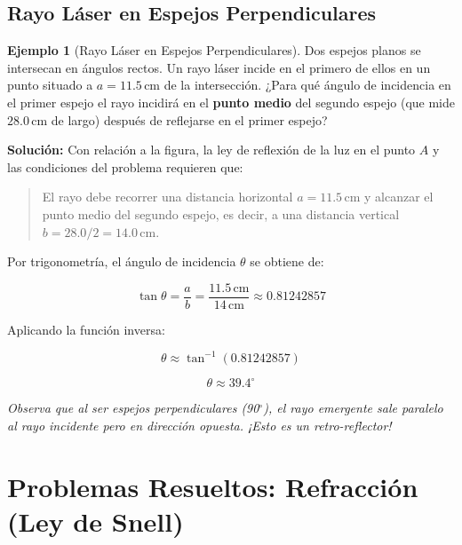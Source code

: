 \documentclass[12pt, a4paper]{article}
\newcommand{\grado}{$^{\circ}$}
\theoremstyle{definition}
\newtheorem{ejemplo}{Ejemplo}[section]
\newcommand{\nota}[1]{\medskip\noindent\colorbox{grisclaro}{\parbox{0.95\linewidth}{\textit{#1}}}\medskip}
\begin{document}
\subsection{Rayo Láser en Espejos Perpendiculares}
\label{sec:laser_perpendicular}

\begin{ejemplo}[Rayo Láser en Espejos Perpendiculares]
Dos espejos planos se intersecan en ángulos rectos. Un rayo láser incide en el primero de ellos
en un punto situado a \(a = 11.5\,\text{cm}\) de la intersección. ¿Para qué ángulo de
incidencia en el primer espejo el rayo incidirá en el \textbf{punto medio} del segundo espejo
(que mide \(28.0\,\text{cm}\) de largo) después de reflejarse en el primer espejo?
\end{ejemplo}

\textbf{Solución:} Con relación a la figura, la ley de reflexión de la luz en el punto \(A\)
y las condiciones del problema requieren que:

\begin{quote}
El rayo debe recorrer una distancia horizontal \(a = 11.5\,\text{cm}\) y alcanzar el punto
medio del segundo espejo, es decir, a una distancia vertical \(b = 28.0/2 = 14.0\,\text{cm}\).
\end{quote}

Por trigonometría, el ángulo de incidencia \(\theta\) se obtiene de:

\begin{equation}
  \tan\theta = \frac{a}{b} = \frac{11.5\,\text{cm}}{14\,\text{cm}} \approx 0.81242857
  \label{eq:tan_theta}
\end{equation}

Aplicando la función inversa:

\begin{equation}
  \theta \approx \tan^{-1}(0.81242857)
  \label{eq:theta_inv}
\end{equation}

\begin{equation}
  \boxed{\theta \approx 39.4^{\circ}}
  \label{eq:theta_laser}
\end{equation}

\nota{Observa que al ser espejos perpendiculares (90\grado), el rayo emergente sale paralelo al rayo
incidente pero en dirección opuesta. ¡Esto es un retro-reflector!}

\section{Problemas Resueltos: Refracción (Ley de Snell)}
\label{sec:problemas_snell}
\end{document}
